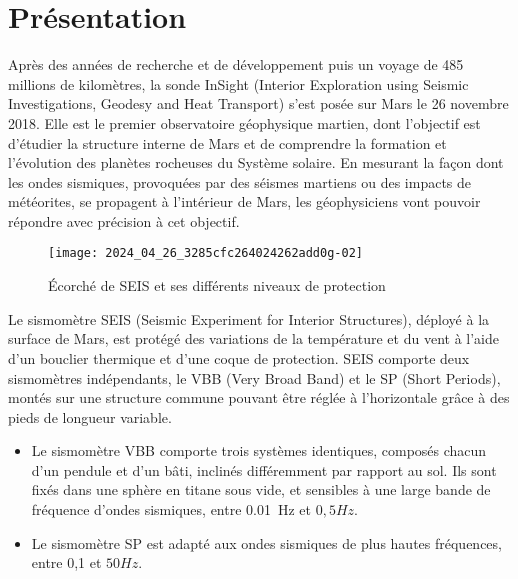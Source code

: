 \section{Présentation}
Après des années de recherche et de développement puis un voyage de 485 millions de kilomètres, la sonde InSight (Interior Exploration using Seismic Investigations, Geodesy and Heat Transport) s'est posée sur Mars le 26 novembre 2018. Elle est le premier observatoire géophysique martien, dont l'objectif est d'étudier la structure interne de Mars et de comprendre la formation et l'évolution des planètes rocheuses du Système solaire. En mesurant la façon dont les ondes sismiques, provoquées par des séismes martiens ou des impacts de météorites, se propagent à l'intérieur de Mars, les géophysiciens vont pouvoir répondre avec précision à cet objectif.


\begin{figure}[!h]
\centering
\texttt{[image: 2024\_04\_26\_3285cfc264024262add0g-02]}
\caption{\label{ccmp2023_fig_01}Écorché de SEIS et ses différents niveaux de protection}
\end{figure}




Le sismomètre SEIS (Seismic Experiment for Interior Structures), déployé à la surface de Mars, est protégé des variations de la température et du vent à l'aide d'un bouclier thermique et d'une coque de protection. SEIS comporte deux sismomètres indépendants, le VBB (Very Broad Band) et le SP (Short Periods), montés sur une structure commune pouvant être réglée à l'horizontale grâce à des pieds de longueur variable.

\begin{itemize}
  \item Le sismomètre VBB comporte trois systèmes identiques, composés chacun d'un pendule et d'un bâti, inclinés différemment par rapport au sol. Ils sont fixés dans une sphère en titane sous vide, et sensibles à une large bande de fréquence d'ondes sismiques, entre \SI{0,01}{Hz} et $0,5 \si{Hz}$.
  \item Le sismomètre SP est adapté aux ondes sismiques de plus hautes fréquences, entre 0,1 et $50 \si{Hz}$.
\end{itemize}

